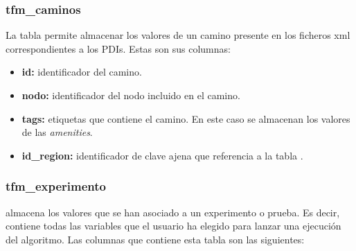 \subsubsection{tfm\_caminos}
La tabla  permite almacenar los valores de un camino presente en los ficheros xml correspondientes a los PDIs. Estas son sus columnas:

\begin{itemize}
	\item \textbf{id:} identificador del camino.
	\item \textbf{nodo:} identificador del nodo incluido en el camino.
	\item \textbf{tags:} etiquetas que contiene el camino. En este caso se almacenan los valores de las \textit{amenities}.
	\item \textbf{id\_region:} identificador de clave ajena que referencia a la tabla .
\end{itemize}

\subsubsection{tfm\_experimento}
 almacena los valores que se han asociado a un experimento o prueba. Es decir, contiene todas las variables que el usuario ha elegido para lanzar una ejecución del algoritmo. Las columnas que contiene esta tabla son las siguientes:

